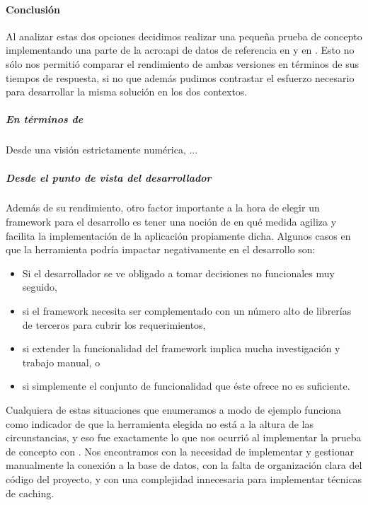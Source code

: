 \paragraph{Conclusión}

Al analizar estas dos opciones decidimos realizar una pequeña prueba de concepto implementando una parte de la \gls{acro:api} de datos de referencia en  y en . Esto no sólo nos permitió comparar el rendimiento de ambas versiones en términos de sus tiempos de respuesta, si no que además pudimos contrastar el esfuerzo necesario para desarrollar la misma solución en los dos contextos.

\subparagraph{En términos de }

Desde una visión estrictamente numérica, ...


\subparagraph{Desde el punto de vista del desarrollador}

Además de su rendimiento, otro factor importante a la hora de elegir un framework para el desarrollo es tener una noción de en qué medida agiliza y facilita la implementación de la aplicación propiamente dicha. Algunos casos en que la herramienta podría impactar negativamente en el desarrollo son:

\begin{itemize}
  \item Si el desarrollador se ve obligado a tomar decisiones no funcionales muy seguido,
  \item si el framework necesita ser complementado con un número alto de librerías de terceros para cubrir los requerimientos,
  \item si extender la funcionalidad del framework implica mucha investigación y trabajo manual, o
  \item si simplemente el conjunto de funcionalidad que éste ofrece no es suficiente.
\end{itemize}

Cualquiera de estas situaciones que enumeramos a modo de ejemplo funciona como indicador de que la herramienta elegida no está a la altura de las circunstancias, y eso fue exactamente lo que nos ocurrió al implementar la prueba de concepto con . Nos encontramos con la necesidad de implementar y gestionar manualmente la conexión a la base de datos, con la falta de organización clara del código del proyecto, y con una complejidad innecesaria para implementar técnicas de caching.

